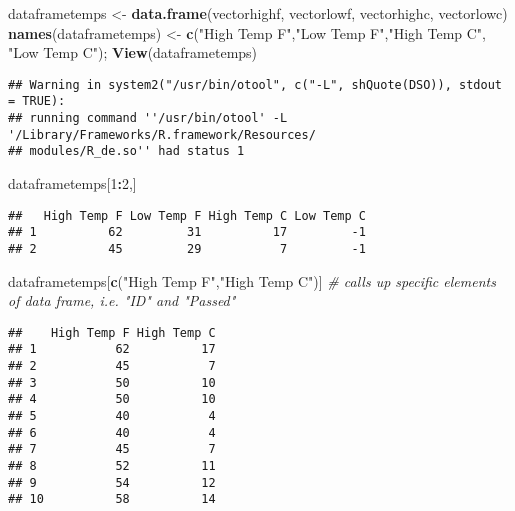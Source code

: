 \documentclass[]{article}
\newenvironment{Shaded}{\begin{snugshade}}{\end{snugshade}}
\newcommand{\KeywordTok}[1]{\textcolor[rgb]{0.13,0.29,0.53}{\textbf{#1}}}
\newcommand{\DecValTok}[1]{\textcolor[rgb]{0.00,0.00,0.81}{#1}}
\newcommand{\StringTok}[1]{\textcolor[rgb]{0.31,0.60,0.02}{#1}}
\newcommand{\CommentTok}[1]{\textcolor[rgb]{0.56,0.35,0.01}{\textit{#1}}}
\newcommand{\OperatorTok}[1]{\textcolor[rgb]{0.81,0.36,0.00}{\textbf{#1}}}
\newcommand{\NormalTok}[1]{#1}
\begin{document}
\begin{Shaded}
\begin{Highlighting}[]
\NormalTok{dataframetemps <-}\StringTok{ }\KeywordTok{data.frame}\NormalTok{(vectorhighf, vectorlowf, vectorhighc, vectorlowc) }
\KeywordTok{names}\NormalTok{(dataframetemps) <-}\StringTok{ }\KeywordTok{c}\NormalTok{(}\StringTok{"High Temp F"}\NormalTok{,}\StringTok{"Low Temp F"}\NormalTok{,}\StringTok{"High Temp C"}\NormalTok{, }\StringTok{"Low Temp C"}\NormalTok{); }\KeywordTok{View}\NormalTok{(dataframetemps) }
\end{Highlighting}
\end{Shaded}

\begin{verbatim}
## Warning in system2("/usr/bin/otool", c("-L", shQuote(DSO)), stdout = TRUE):
## running command ''/usr/bin/otool' -L '/Library/Frameworks/R.framework/Resources/
## modules/R_de.so'' had status 1
\end{verbatim}

\begin{Shaded}
\begin{Highlighting}[]
\NormalTok{dataframetemps[}\DecValTok{1}\OperatorTok{:}\DecValTok{2}\NormalTok{,] }
\end{Highlighting}
\end{Shaded}

\begin{verbatim}
##   High Temp F Low Temp F High Temp C Low Temp C
## 1          62         31          17         -1
## 2          45         29           7         -1
\end{verbatim}

\begin{Shaded}
\begin{Highlighting}[]
\NormalTok{dataframetemps[}\KeywordTok{c}\NormalTok{(}\StringTok{"High Temp F"}\NormalTok{,}\StringTok{"High Temp C"}\NormalTok{)] }\CommentTok{# calls up specific elements of data frame, i.e. "ID" and "Passed"}
\end{Highlighting}
\end{Shaded}

\begin{verbatim}
##    High Temp F High Temp C
## 1           62          17
## 2           45           7
## 3           50          10
## 4           50          10
## 5           40           4
## 6           40           4
## 7           45           7
## 8           52          11
## 9           54          12
## 10          58          14
\end{verbatim}
\end{document}
